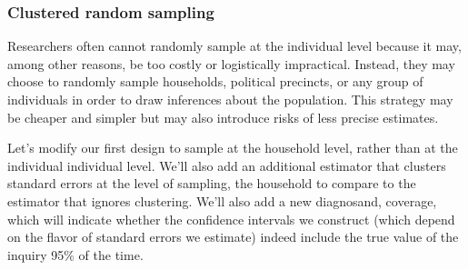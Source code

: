 \documentclass[
]{article}
\begin{document}
\hypertarget{clustered-random-sampling}{%
\subsubsection{Clustered random
sampling}\label{clustered-random-sampling}}

Researchers often cannot randomly sample at the individual level because
it may, among other reasons, be too costly or logistically impractical.
Instead, they may choose to randomly sample households, political
precincts, or any group of individuals in order to draw inferences about
the population. This strategy may be cheaper and simpler but may also
introduce risks of less precise estimates.

Let's modify our first design to sample at the household level, rather
than at the individual individual level. We'll also add an additional
estimator that clusters standard errors at the level of sampling, the
household to compare to the estimator that ignores clustering. We'll
also add a new diagnosand, coverage, which will indicate whether the
confidence intervals we construct (which depend on the flavor of
standard errors we estimate) indeed include the true value of the
inquiry 95\% of the time.
\end{document}
